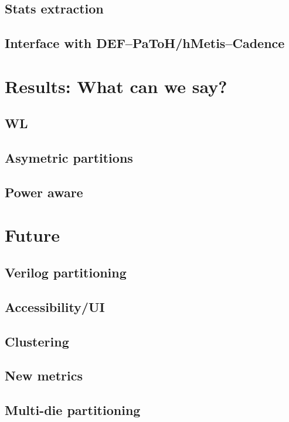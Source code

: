 \documentclass[12pt,a4paper]{article}
\theoremstyle{customdef}
\begin{document}
\subsection{Stats extraction}
\subsection{Interface with DEF--PaToH/hMetis--Cadence}


\section{Results: What can we say?}
\subsection{WL}
\subsection{Asymetric partitions}
\subsection{Power aware}

\section{Future}
\subsection{Verilog partitioning}
\subsection{Accessibility/UI}
\subsection{Clustering}
\subsection{New metrics}
\subsection{Multi-die partitioning}

\clearpage

\glsaddall
\printglossaries

\newpage

% 

\end{document}
